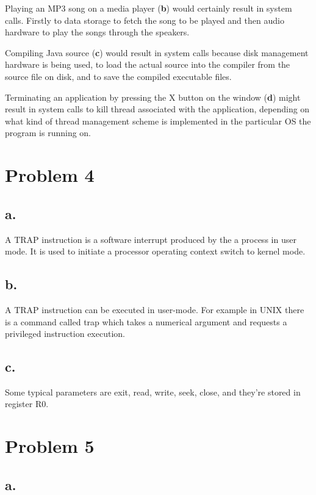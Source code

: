 \documentclass[11pt]{article} %
\begin{document}
Playing an MP3 song on a media player (\textbf{b}) would certainly result in system calls. Firstly to data storage to fetch the song to be played and then audio hardware to play the songs through the speakers.

Compiling Java source (\textbf{c}) would  result in system calls because disk management hardware is being used, to load the actual source into the compiler from the source file on disk, and to save the compiled executable files.

Terminating an application by pressing the X button on the window (\textbf{d}) might result in system calls to kill thread associated with the application, depending on what kind of thread management scheme is implemented in the particular OS the program is running on.

\section*{Problem 4}

\subsection*{a.}

A TRAP instruction is a software interrupt produced by the a process in user mode. It is used to initiate a processor operating context switch to kernel mode. 

\subsection*{b.}

A TRAP instruction can be executed in user-mode. For example in UNIX there is a command called trap which takes a numerical argument and requests a privileged instruction execution.

\subsection*{c.}

Some typical parameters are exit, read, write, seek, close, and they're stored in register R0.

\section*{Problem 5}

\subsection*{a.}
\end{document}
